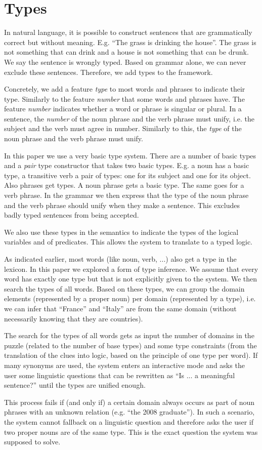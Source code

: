 \section{Types}
\label{sec:types}
In natural language, it is possible to construct sentences that are grammatically correct but without meaning. E.g. ``The grass is drinking the house''. The grass is not something that can drink and a house is not something that can be drunk. We say the sentence is wrongly typed. Based on grammar alone, we can never exclude these sentences. Therefore, we add types to the framework.

Concretely, we add a feature \textit{type} to most words and phrases to indicate their type. Similarly to the feature \textit{number} that some words and phrases have. The feature \textit{number} indicates whether a word or phrase is singular or plural. In a sentence, the \textit{number} of the noun phrase and the verb phrase must unify, i.e. the subject and the verb must agree in number. Similarly to this, the \textit{type} of the noun phrase and the verb phrase must unify.

In this paper we use a very basic type system. There are a number of basic types and a \textit{pair} type constructor that takes two basic types. E.g. a noun has a basic type, a transitive verb a pair of types: one for its subject and one for its object. Also phrases get types. A noun phrase gets a basic type. The same goes for a verb phrase. In the grammar we then express that the type of the noun phrase and the verb phrase should unify when they make a sentence. This excludes badly typed sentences from being accepted.

We also use these types in the semantics to indicate the types of the logical variables and of predicates. This allows the system to translate to a typed logic.

As indicated earlier, most words (like noun, verb, ...) also get a type in the lexicon. In this paper we explored a form of type inference. We assume that every word has exactly one type but that is not explicitly given to the system. We then search the types of all words. Based on these types, we can group the domain elements (represented by a proper noun) per domain (represented by a type), i.e. we can infer that ``France'' and ``Italy'' are from the same domain (without necessarily knowing that they are countries).

The search for the types of all words gets as input the number of domains in the puzzle (related to the number of base types) and some type constraints (from the translation of the clues into logic, based on the principle of one type per word). If many synonyms are used, the system enters an interactive mode and asks the user some linguistic questions that can be rewritten as ``Is ... a meaningful sentence?'' until the types are unified enough.

This process fails if (and only if) a certain domain always occurs as part of noun phrases with an unknown relation (e.g. ``the 2008 graduate''). In such a scenario, the system cannot fallback on a linguistic question and therefore asks the user if two proper nouns are of the same type. This is the exact question the system was supposed to solve.
